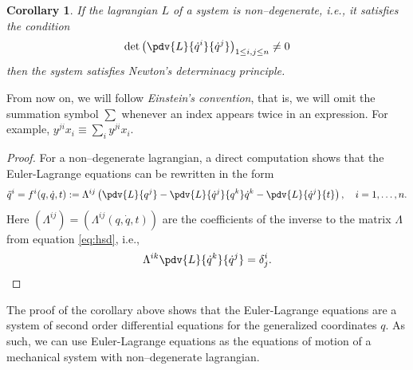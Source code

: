 \documentclass[english,fontsize=11pt,paper=b5]{scrbook}
\newtheorem{corollary}[theorem]{Corollary}
\theoremstyle{definition}
\newcommand{\emphidx}[1]{\index{#1}\emph{#1}}
\begin{document}
    \begin{corollary}
      If the lagrangian $L$ of a system is \emph{non--degenerate}, i.e., it satisfies the condition
      \begin{equation}
        \det \left(\pdv{L}{\dot q^i}{\dot q^j}
        \right)_{1\leq i,j\leq n} \neq 0
      \end{equation}
      then the system satisfies Newton's determinacy principle.
    \end{corollary}

    \begin{tcolorbox}[title=Einstein's convention]
      From now on, we will follow \emphidx{Einstein's convention}, that is, we will omit the summation symbol $\sum$ whenever an index appears twice in an expression.
      For example, $y^{ji} x_i \equiv \sum_i y^{ji} x_i$.
    \end{tcolorbox}


    \begin{proof}
      For a non--degenerate lagrangian, a direct computation shows that the Euler-Lagrange equations can be rewritten in the form
      \begin{equation}
        \ddot q^i = f^i(q,\dot q, t)
        := \Lambda^{ij}\left(\pdv{L}{q^j} - \pdv{L}{\dot q^j}{q^k} \dot q^k - \pdv{L}{\dot q^j}{t}\right),
        \quad i=1,\ldots,n.
      \end{equation}
      Here $\left(\Lambda^{ij}\right) = \left(\Lambda^{ij}(q, \dot q, t)\right)$ are the coefficients of the inverse to the matrix $\Lambda$ from equation \eqref{eq:hsd}, i.e.,
      \begin{equation}
      \Lambda^{ik} \pdv{L}{\dot q^k}{\dot q^j} = \delta^{i}_{j}.
      \end{equation}
    \end{proof}

    The proof of the corollary above shows that the Euler-Lagrange equations are a system of second order differential equations for the generalized coordinates $q$.
    As such, we can use Euler-Lagrange equations as the equations of motion of a mechanical system with non--degenerate lagrangian.
\end{document}
